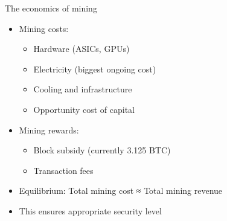 \documentclass[aspectratio=169, lualatex, handout]{beamer}
\begin{document}
\begin{frame}{The economics of mining}
	\begin{itemize}
		\item Mining costs:
		      \begin{itemize}
			      \item Hardware (ASICs, GPUs)
			      \item Electricity (biggest ongoing cost)
			      \item Cooling and infrastructure
			      \item Opportunity cost of capital
		      \end{itemize}
		\item Mining rewards:
		      \begin{itemize}
			      \item Block subsidy (currently 3.125 BTC)
			      \item Transaction fees
		      \end{itemize}
		\item Equilibrium: Total mining cost ≈ Total mining revenue
		\item This ensures appropriate security level
	\end{itemize}
\end{frame}
\end{document}
